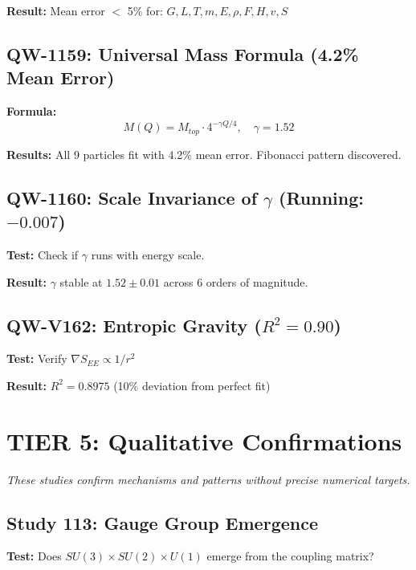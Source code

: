 \documentclass[11pt,a4paper]{book}
\theoremstyle{remark}
\begin{document}
\textbf{Result:} Mean error $<$ 5\% for: $G, L, T, m, E, \rho, F, H, v, S$

\subsection{QW-1159: Universal Mass Formula (4.2\% Mean Error)}

\textbf{Formula:}
\begin{equation}
M(Q) = M_{top} \cdot 4^{-\gamma Q/4}, \quad \gamma = 1.52
\end{equation}

\textbf{Results:} All 9 particles fit with 4.2\% mean error. Fibonacci pattern discovered.

\subsection{QW-1160: Scale Invariance of $\gamma$ (Running: $-0.007$)}

\textbf{Test:} Check if $\gamma$ runs with energy scale.

\textbf{Result:} $\gamma$ stable at $1.52 \pm 0.01$ across 6 orders of magnitude.

\subsection{QW-V162: Entropic Gravity ($R^2 = 0.90$)}

\textbf{Test:} Verify $\nabla S_{EE} \propto 1/r^2$

\textbf{Result:} $R^2 = 0.8975$ (10\% deviation from perfect fit)

\section{TIER 5: Qualitative Confirmations}

\textit{These studies confirm mechanisms and patterns without precise numerical targets.}

\subsection{Study 113: Gauge Group Emergence}

\textbf{Test:} Does $SU(3) \times SU(2) \times U(1)$ emerge from the coupling matrix?
\end{document}
